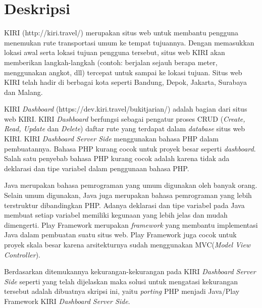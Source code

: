 \documentclass[a4paper,twoside]{article}
\begin{document}
\title{\@judultopik}
\author{\nama \textendash \@npm} 

\newcommand{\nama}{Tommy Adhitya The}
\newcommand{\@npm}{2012730031}
\newcommand{\@judultopik}{\textit{Porting} PHP menjadi Java/Play Framework. Studi Kasus: KIRI \textit{Dashboard Server Side}} %
\newcommand{\jumpemb}{1} %
\newcommand{\tanggal}{11/09/2015}
\maketitle


\section{Deskripsi}
KIRI (http://kiri.travel/) merupakan situs web untuk membantu pengguna menemukan rute transportasi umum ke tempat tujuannya. Dengan memasukkan lokasi awal serta lokasi tujuan pengguna tersebut, situs web KIRI akan memberikan langkah-langkah (contoh: berjalan sejauh berapa meter, menggunakan angkot, dll) tercepat untuk sampai ke lokasi tujuan. Situs web KIRI telah hadir di berbagai kota seperti Bandung, Depok, Jakarta, Surabaya dan Malang.

KIRI \textit{Dashboard} (https://dev.kiri.travel/bukitjarian/) adalah bagian dari situs web KIRI. KIRI \textit{Dashboard} berfungsi sebagai pengatur proses CRUD (\textit{Create, Read, Update} dan \textit{Delete}) daftar rute yang terdapat dalam \textit{database} situs web KIRI. KIRI \textit{Dashboard Server Side} menggunakan bahasa PHP dalam pembuatannya. Bahasa PHP kurang cocok untuk proyek besar seperti \textit{dashboard}. Salah satu penyebab bahasa PHP kurang cocok adalah karena tidak ada deklarasi dan tipe variabel dalam penggunaan bahasa PHP.

Java merupakan bahasa pemrograman yang umum digunakan oleh banyak orang. Selain umum digunakan, Java juga merupakan bahasa pemrograman yang lebih terstruktur dibandingkan PHP. Adanya deklarasi dan tipe variabel pada Java membuat setiap variabel memiliki kegunaan yang lebih jelas dan mudah dimengerti. Play Framework merupakan \textit{framework} yang membantu implementasi Java dalam pembuatan suatu situs web. Play Framework juga cocok untuk proyek skala besar karena arsitekturnya sudah menggunakan MVC(\textit{Model View Controller}).

Berdasarkan ditemukannya kekurangan-kekurangan pada KIRI \textit{Dashboard Server Side} seperti yang telah dijelaskan maka solusi untuk mengatasi kekurangan tersebut adalah dibuatnya skripsi ini, yaitu \textit{porting} PHP menjadi Java/Play Framework KIRI \textit{Dashboard Server Side}.
\end{document}

